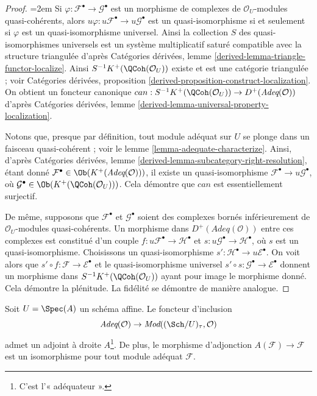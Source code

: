 \begin{proof}
{\emergencystretch=2em
Si $\varphi : \mathcal{F}^\bullet \to \mathcal{G}^\bullet$
est un morphisme de complexes de
$\mathcal{O}_U$-modules quasi-cohérents, alors $u\varphi : u\mathcal{F}^\bullet \to
u\mathcal{G}^\bullet$ est un quasi-isomorphisme si et seulement si $\varphi$ est
un quasi-isomorphisme universel. Ainsi la collection $S$
des quasi-isomorphismes universels est un système multiplicatif
saturé compatible avec la structure triangulée d'après
Catégories dérivées, lemme \ref{derived-lemma-triangle-functor-localize}.
Ainsi $S^{-1}K^+(\QCoh(\mathcal{O}_U))$ existe et est une
catégorie triangulée ; voir
Catégories dérivées, proposition
\ref{derived-proposition-construct-localization}.
On obtient un foncteur canonique
$can : S^{-1}K^+(\QCoh(\mathcal{O}_U)) \to
D^{+}(\textit{Adeq}(\mathcal{O}))$ d'après
Catégories dérivées, lemme \ref{derived-lemma-universal-property-localization}.
\par}

\medskip\noindent
Notons que, presque par définition, tout module adéquat sur $U$ se plonge
dans un faisceau quasi-cohérent ; voir le
lemme \ref{lemma-adequate-characterize}. Ainsi, d'après
Catégories dérivées, lemme \ref{derived-lemma-subcategory-right-resolution},
étant donné $\mathcal{F}^\bullet \in \Ob(K^+(\textit{Adeq}(\mathcal{O})))$,
il existe un quasi-isomorphisme
$\mathcal{F}^\bullet \to u\mathcal{G}^\bullet$,
où $\mathcal{G}^\bullet \in \Ob(K^+(\QCoh(\mathcal{O}_U)))$.
Cela démontre que $can$ est essentiellement surjectif.

\medskip\noindent
De même, supposons que $\mathcal{F}^\bullet$ et $\mathcal{G}^\bullet$
soient des complexes bornés inférieurement de $\mathcal{O}_U$-modules quasi-cohérents.
Un morphisme dans $D^+(\textit{Adeq}(\mathcal{O}))$ entre ces
complexes est constitué d'un couple $f : u\mathcal{F}^\bullet \to \mathcal{H}^\bullet$
et $s : u\mathcal{G}^\bullet \to \mathcal{H}^\bullet$, où $s$
est un quasi-isomorphisme. Choisissons un quasi-isomorphisme
$s' : \mathcal{H}^\bullet \to u\mathcal{E}^\bullet$. On voit alors que
$s' \circ f : \mathcal{F} \to \mathcal{E}^\bullet$ et le
quasi-isomorphisme universel
$s' \circ s : \mathcal{G}^\bullet \to \mathcal{E}^\bullet$ donnent
un morphisme dans $S^{-1}K^{+}(\QCoh(\mathcal{O}_U))$ ayant pour image
le morphisme donné. Cela démontre la plénitude.
La fidélité se démontre de manière analogue.
\end{proof}

\begin{lemma}
\label{lemma-right-adjoint-adequate}
Soit $U = \Spec(A)$ un schéma affine.
Le foncteur d'inclusion
$$
\textit{Adeq}(\mathcal{O}) \to
\textit{Mod}((\Sch/U)_\tau, \mathcal{O})
$$
admet un adjoint à droite $A$\footnote{C'est l'« adéquateur ».}.
De plus, le morphisme d'adjonction
$A(\mathcal{F}) \to \mathcal{F}$ est un isomorphisme pour tout
module adéquat $\mathcal{F}$.
\end{lemma}

